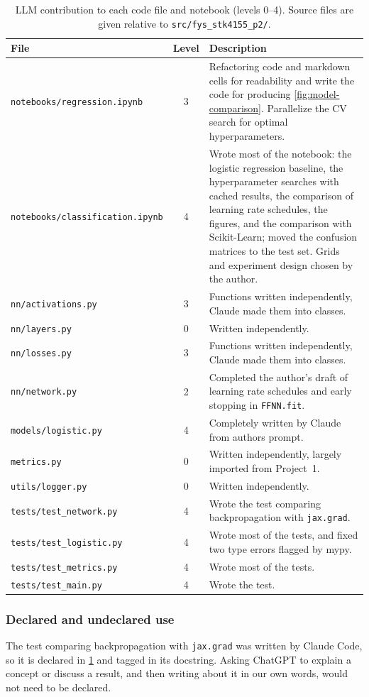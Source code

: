 \begin{table}[htbp]
    \centering
    \caption{LLM contribution to each code file and notebook (levels 0--4). Source files are
    given relative to \texttt{src/fys\_stk4155\_p2/}.}
    \label{tab:code-generation}
    {\footnotesize
    \begin{tabularx}{\textwidth}{@{}l c X@{}}
        \toprule
        \textbf{File} & \textbf{Level} & \textbf{Description} \\
        \midrule
        \texttt{notebooks/regression.ipynb} & 3 & Refactoring code and markdown cells for readability
        and write the code for producing \cref{fig:model-comparison}. Parallelize the CV search for
        optimal hyperparameters. \\
        \texttt{notebooks/classification.ipynb} & 4 & Wrote most of the notebook: the logistic regression
        baseline, the hyperparameter searches with cached results, the comparison of learning
        rate schedules, the figures, and the comparison with Scikit-Learn; moved the confusion
        matrices to the test set. Grids and experiment design chosen by the author. \\
        \texttt{nn/activations.py} & 3 & Functions written independently, Claude made them into classes. \\
        \texttt{nn/layers.py} & 0 & Written independently. \\
        \texttt{nn/losses.py} & 3 & Functions written independently, Claude made them into classes. \\
        \texttt{nn/network.py} & 2 & Completed the author's draft of learning rate schedules
        and early stopping in \texttt{FFNN.fit}. \\
        \texttt{models/logistic.py} & 4 & Completely written by Claude from authors prompt. \\
        \texttt{metrics.py} & 0 & Written independently, largely imported from Project~1. \\
        \texttt{utils/logger.py} & 0 & Written independently. \\
        \texttt{tests/test\_network.py} & 4 & Wrote the test comparing backpropagation with
        \texttt{jax.grad}. \\
        \texttt{tests/test\_logistic.py} & 4 & Wrote most of the tests, and fixed two type
        errors flagged by mypy. \\
        \texttt{tests/test\_metrics.py} & 4 & Wrote most of the tests. \\
        \texttt{tests/test\_main.py} & 4 & Wrote the test. \\
        \bottomrule
    \end{tabularx}}
\end{table}

\subsubsection{Declared and undeclared use}
The test comparing backpropagation with \texttt{jax.grad} was written by Claude Code, so it
is declared in \cref{tab:code-generation} and tagged in its docstring. Asking ChatGPT to
explain a concept or discuss a result, and then writing about it in our own words, would not
need to be declared.
